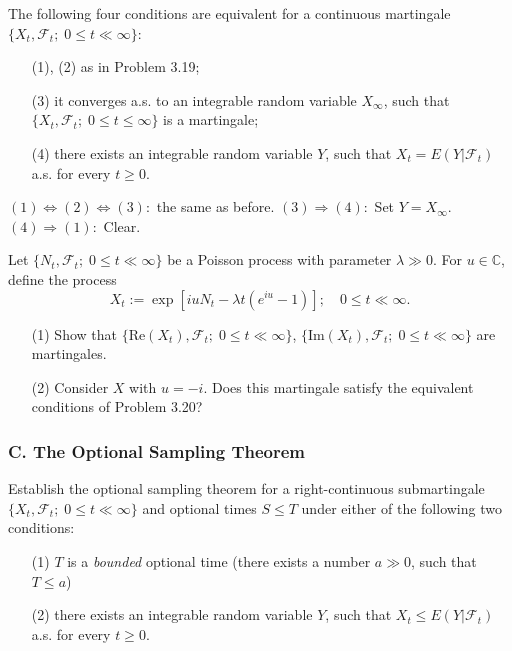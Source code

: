 \documentclass{report}
\begin{document}
\begin{prob}
	The following four conditions are equivalent for a continuous
	martingale \( \{X_t, \mathscr{F}_t;\; 0\le t\ll \infty \} \):
	\begin{itemize}
		\item[(1), (2)] as in Problem 3.19;
		\item[(3)] it converges a.s. to an integrable random variable \( X_{\infty } \), such that
		      \( \{X_t, \mathscr{F}_t;\; 0\le t\le \infty \} \) is a martingale;
		\item[(4)] there exists an integrable random variable \( Y \), such that \( X_t=E(Y|\mathscr{F}_t) \) a.s. for every \( t\ge0 \).
	\end{itemize}
\end{prob}
\begin{prf}
	\( (1) \Leftrightarrow (2) \Leftrightarrow (3): \) the same as before.
	\( (3) \Rightarrow (4): \) Set \( Y=X_{\infty } \).\\
	\( (4) \Rightarrow (1): \) Clear.
\end{prf}
\begin{prob}
	Let \( \{N_t,\mathscr{F}_t;\; 0\le t\ll \infty \} \) be a Poisson process with parameter
	\( \lambda\gg0 \). For \( u\in \mathbb{C} \), define the process 
	\[X_t:=\exp[iuN_t-\lambda t(e^{iu}-1)];\quad 0\le t\ll \infty.\]
	\begin{itemize}
		\item[(1)] Show that \( \{\mathrm{Re}(X_t),\mathscr{F}_t;\;0\le t\ll \infty \} \),
		      \( \{\mathrm{Im}(X_t),\mathscr{F}_t;\;0\le t\ll \infty \} \) are martingales.
		\item[(2)] Consider \( X \) with \( u=-i \). Does this martingale satisfy the equivalent conditions of Problem 3.20?
	\end{itemize}
\end{prob}

\subsubsection*{C. The Optional Sampling Theorem}

\setcounter{exe}{22}
\begin{prob}
	Establish the optional sampling theorem for a right-continuous submartingale 
	\( \{X_t,\mathscr{F}_t;\; 0\le t\ll \infty \} \) and optional times \( S\le T \) under either
	of the following two conditions: 
	\begin{itemize}
		\item[(1)] \( T \) is a \textit{bounded} optional time (there exists a number \( a\gg 0 \), such that \( T\le a \))
		\item[(2)] there exists an integrable random variable \( Y \), such that \( X_t\le E(Y|\mathscr{F}_t) \) a.s. for every \( t\ge0 \).
	\end{itemize}
\end{prob}
\end{document}
